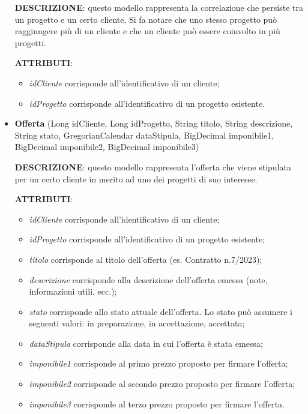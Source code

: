 \begin{itemize}
\setlength{\parskip}{3ex}

\textbf{DESCRIZIONE}: questo modello rappresenta la correlazione che persiste tra un progetto e un certo cliente. Si fa notare che uno stesso progetto può raggiungere più di un cliente e che un cliente può essere coinvolto in più progetti.

\setlength{\parskip}{3ex}

\textbf{ATTRIBUTI}:
\begin{itemize}
\item \textit{idCliente} corrisponde all'identificativo di un cliente;
\item \textit{idProgetto} corrisponde all'identificativo di un progetto esistente.
\end{itemize}

\pagebreak

\item \textbf{Offerta} (Long idCliente, Long idProgetto, String titolo, String descrizione, String stato, GregorianCalendar dataStipula, BigDecimal imponibile1, BigDecimal imponibile2, BigDecimal imponibile3)

\setlength{\parskip}{3ex}

\textbf{DESCRIZIONE}: questo modello rappresenta l'offerta che viene stipulata per un certo cliente in merito ad uno dei progetti di suo interesse.

\setlength{\parskip}{3ex}

\textbf{ATTRIBUTI}:
\begin{itemize}
\item \textit{idCliente} corrisponde all'identificativo di un cliente;
\item \textit{idProgetto} corrisponde all'identificativo di un progetto esistente;
\item \textit{titolo} corrisponde al titolo dell'offerta (es. Contratto n.7/2023);
\item \textit{descrizione} corrisponde alla descrizione dell'offerta emessa (note, informazioni utili, ecc.);
\item \textit{stato} corrisponde allo stato attuale dell'offerta. Lo stato può assumere i seguenti valori: in preparazione, in accettazione, accettata;
\item \textit{dataStipula} corrisponde alla data in cui l'offerta è stata emessa;
\item \textit{imponibile1} corrisponde al primo prezzo proposto per firmare l'offerta;
\item \textit{imponibile2} corrisponde al secondo prezzo proposto per firmare l'offerta;
\item \textit{imponibile3} corrisponde al terzo prezzo proposto per firmare l'offerta.
\end{itemize}
\end{itemize}

